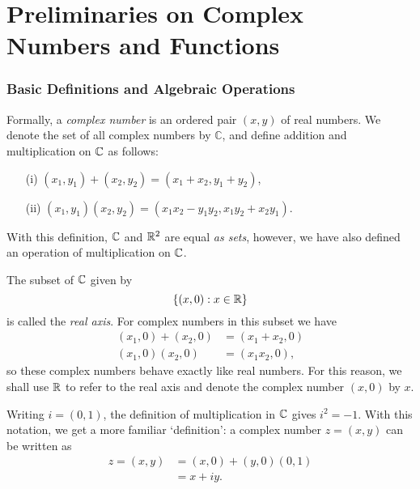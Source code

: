 
\chapter[Complex Numbers and Functions]{Preliminaries on Complex Numbers and Functions}


\subsection{Basic Definitions and Algebraic Operations}



Formally, a \emph{complex number} is an ordered pair $(x,y)$ of real numbers.  We denote the set of all complex numbers by $\mathbb{C}$, and define addition and multiplication on $\mathbb{C}$ as follows:
\begin{enumerate}
\item[(i)] $(x_1,y_1)+(x_2,y_2) = (x_1+x_2,y_1+y_2)$,
\item[(ii)] $(x_1,y_1)(x_2,y_2) = (x_1x_2-y_1y_2,x_1y_2+x_2y_1)$.
\end{enumerate}
With this definition, $\mathbb{C}$ and $\mathbb{R}^2$ are equal \emph{as sets}, however, we have also defined an operation of multiplication on $\mathbb{C}$.


The subset of $\mathbb{C}$ given by 
\[
\left\{(x,0): x \in \mathbb{R} \right\} 
\]
is called the \emph{real axis}.  For complex numbers in this subset we have
\begin{align*}
(x_1,0)+(x_2,0) & = (x_1+x_2,0) \\
(x_1,0)(x_2,0) &= (x_1x_2,0), 
\end{align*}
so these complex numbers behave exactly like real numbers.  For this reason, we shall use $\mathbb{R}$ to refer to the real axis and denote the complex number $(x,0)$ by $x$.



Writing $i=(0,1)$, the definition of multiplication in $\mathbb{C}$ gives $i^2=-1$. With this notation, we get a more familiar `definition': a complex number $z=(x,y)$ can be written as
\begin{align*}
z = (x,y) &= (x,0)+(y,0)(0,1) \\
& = x + iy.
\end{align*}

